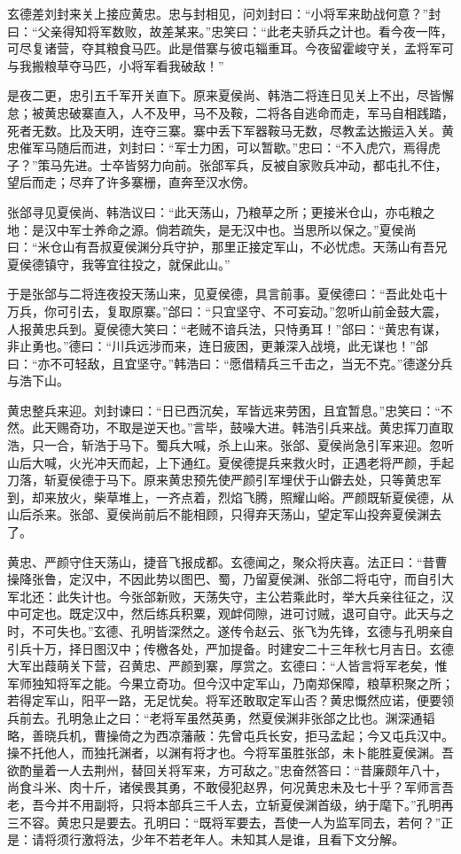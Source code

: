 玄德差刘封来关上接应黄忠。忠与封相见，问刘封曰：“小将军来助战何意？”封曰：“父亲得知将军数败，故差某来。”忠笑曰：“此老夫骄兵之计也。看今夜一阵，可尽复诸营，夺其粮食马匹。此是借寨与彼屯辎重耳。今夜留霍峻守关，孟将军可与我搬粮草夺马匹，小将军看我破敌！”

是夜二更，忠引五千军开关直下。原来夏侯尚、韩浩二将连日见关上不出，尽皆懈怠；被黄忠破寨直入，人不及甲，马不及鞍，二将各自逃命而走，军马自相践踏，死者无数。比及天明，连夺三寨。寨中丢下军器鞍马无数，尽教孟达搬运入关。黄忠催军马随后而进，刘封曰：“军士力困，可以暂歇。”忠曰：“不入虎穴，焉得虎子？”策马先进。士卒皆努力向前。张郃军兵，反被自家败兵冲动，都屯扎不住，望后而走；尽弃了许多寨栅，直奔至汉水傍。

张郃寻见夏侯尚、韩浩议曰：“此天荡山，乃粮草之所；更接米仓山，亦屯粮之地：是汉中军士养命之源。倘若疏失，是无汉中也。当思所以保之。”夏侯尚曰：“米仓山有吾叔夏侯渊分兵守护，那里正接定军山，不必忧虑。天荡山有吾兄夏侯德镇守，我等宜往投之，就保此山。”

于是张郃与二将连夜投天荡山来，见夏侯德，具言前事。夏侯德曰：“吾此处屯十万兵，你可引去，复取原寨。”郃曰：“只宜坚守、不可妄动。”忽听山前金鼓大震，人报黄忠兵到。夏侯德大笑曰：“老贼不谙兵法，只恃勇耳！”郃曰：“黄忠有谋，非止勇也。”德曰：“川兵远涉而来，连日疲困，更兼深入战境，此无谋也！”郃曰：“亦不可轻敌，且宜坚守。”韩浩曰：“愿借精兵三千击之，当无不克。”德遂分兵与浩下山。

黄忠整兵来迎。刘封谏曰：“日已西沉矣，军皆远来劳困，且宜暂息。”忠笑曰：“不然。此天赐奇功，不取是逆天也。”言毕，鼓噪大进。韩浩引兵来战。黄忠挥刀直取浩，只一合，斩浩于马下。蜀兵大喊，杀上山来。张郃、夏侯尚急引军来迎。忽听山后大喊，火光冲天而起，上下通红。夏侯德提兵来救火时，正遇老将严颜，手起刀落，斩夏侯德于马下。原来黄忠预先使严颜引军埋伏于山僻去处，只等黄忠军到，却来放火，柴草堆上，一齐点着，烈焰飞腾，照耀山峪。严颜既斩夏侯德，从山后杀来。张郃、夏侯尚前后不能相顾，只得弃天荡山，望定军山投奔夏侯渊去了。

黄忠、严颜守住天荡山，捷音飞报成都。玄德闻之，聚众将庆喜。法正曰：“昔曹操降张鲁，定汉中，不因此势以图巴、蜀，乃留夏侯渊、张郃二将屯守，而自引大军北还：此失计也。今张郃新败，天荡失守，主公若乘此时，举大兵亲往征之，汉中可定也。既定汉中，然后练兵积粟，观衅伺隙，进可讨贼，退可自守。此天与之时，不可失也。”玄德、孔明皆深然之。遂传令赵云、张飞为先锋，玄德与孔明亲自引兵十万，择日图汉中；传檄各处，严加提备。时建安二十三年秋七月吉日。玄德大军出葭萌关下营，召黄忠、严颜到寨，厚赏之。玄德曰：“人皆言将军老矣，惟军师独知将军之能。今果立奇功。但今汉中定军山，乃南郑保障，粮草积聚之所；若得定军山，阳平一路，无足忧矣。将军还敢取定军山否？黄忠慨然应诺，便要领兵前去。孔明急止之曰：“老将军虽然英勇，然夏侯渊非张郃之比也。渊深通韬略，善晓兵机，曹操倚之为西凉藩蔽：先曾屯兵长安，拒马孟起；今又屯兵汉中。操不托他人，而独托渊者，以渊有将才也。今将军虽胜张郃，未卜能胜夏侯渊。吾欲酌量着一人去荆州，替回关将军来，方可敌之。”忠奋然答曰：“昔廉颇年八十，尚食斗米、肉十斤，诸侯畏其勇，不敢侵犯赵界，何况黄忠未及七十乎？军师言吾老，吾今并不用副将，只将本部兵三千人去，立斩夏侯渊首级，纳于麾下。”孔明再三不容。黄忠只是要去。孔明曰：“既将军要去，吾使一人为监军同去，若何？”正是：请将须行激将法，少年不若老年人。未知其人是谁，且看下文分解。